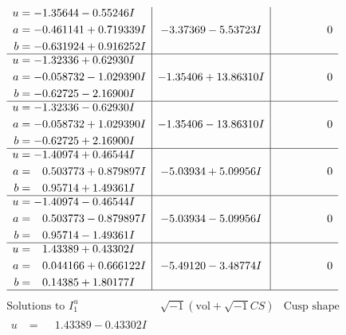 \documentclass[1p]{elsarticle_modified}
\theoremstyle{definition}
\newcommand{\I}{\sqrt{-1}}
\begin{document}
$$\begin{array}{c|c|c}
\begin{aligned}
u &= -1.35644 - 0.55246 I \\
a &= -0.461141 + 0.719339 I \\
b &= -0.631924 + 0.916252 I\end{aligned}
 & -3.37369 - 5.53723 I & \phantom{-0.000000 } 0 \\ \hline\begin{aligned}
u &= -1.32336 + 0.62930 I \\
a &= -0.058732 - 1.029390 I \\
b &= -0.62725 - 2.16900 I\end{aligned}
 & -1.35406 + 13.86310 I & \phantom{-0.000000 } 0 \\ \hline\begin{aligned}
u &= -1.32336 - 0.62930 I \\
a &= -0.058732 + 1.029390 I \\
b &= -0.62725 + 2.16900 I\end{aligned}
 & -1.35406 - 13.86310 I & \phantom{-0.000000 } 0 \\ \hline\begin{aligned}
u &= -1.40974 + 0.46544 I \\
a &= \phantom{-}0.503773 + 0.879897 I \\
b &= \phantom{-}0.95714 + 1.49361 I\end{aligned}
 & -5.03934 + 5.09956 I & \phantom{-0.000000 } 0 \\ \hline\begin{aligned}
u &= -1.40974 - 0.46544 I \\
a &= \phantom{-}0.503773 - 0.879897 I \\
b &= \phantom{-}0.95714 - 1.49361 I\end{aligned}
 & -5.03934 - 5.09956 I & \phantom{-0.000000 } 0 \\ \hline\begin{aligned}
u &= \phantom{-}1.43389 + 0.43302 I \\
a &= \phantom{-}0.044166 + 0.666122 I \\
b &= \phantom{-}0.14385 + 1.80177 I\end{aligned}
 & -5.49120 - 3.48774 I & \phantom{-0.000000 } 0\\
 \hline 
 \end{array}$$\newpage$$\begin{array}{c|c|c}  
\text{Solutions to }I^u_{1}& \I (\text{vol} + \sqrt{-1}CS) & \text{Cusp shape}\\
 \hline 
\begin{aligned}
u &= \phantom{-}1.43389 - 0.43302 I \\

\end{aligned}
\end{array}$$
\end{document}

